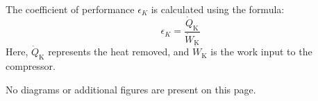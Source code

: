The coefficient of performance \( \epsilon_K \) is calculated using the formula:  
\[
\epsilon_K = \frac{\dot{Q}_{\text{K}}}{\dot{W}_{\text{K}}}
\]  
Here, \( \dot{Q}_{\text{K}} \) represents the heat removed, and \( \dot{W}_{\text{K}} \) is the work input to the compressor.  

No diagrams or additional figures are present on this page.